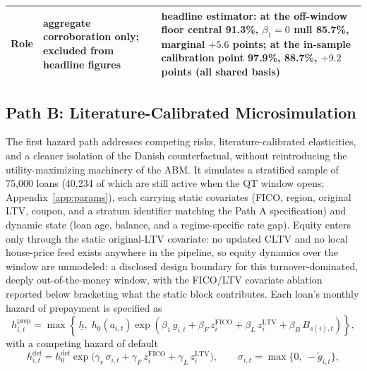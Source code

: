 \documentclass[12pt]{article}
\begin{document}
\begin{table}[H]
\begin{threeparttable}
\begin{tabular}{@{}p{2.2cm}p{5.9cm}p{5.9cm}@{}}
Role & aggregate corroboration only; excluded from headline figures & headline estimator: at the off-window floor central 91.3\%, $\beta_1 = 0$ null 85.7\%, marginal $+5.6$ points; at the in-sample calibration point 97.9\%, 88.7\%, $+9.2$ points (all shared basis) \\
\bottomrule
\end{tabular}
\end{threeparttable}
\end{table}

\subsection{Path B: Literature-Calibrated Microsimulation}\label{sec:pathb}

The first hazard path addresses competing risks, literature-calibrated elasticities, and a cleaner isolation of the Danish counterfactual, without reintroducing the utility-maximizing machinery of the ABM. It simulates a stratified sample of 75,000 loans (40,234 of which are still active when the QT window opens; Appendix~\ref{app:params}), each carrying static covariates (FICO, region, original LTV, coupon, and a stratum identifier matching the Path A specification) and dynamic state (loan age, balance, and a regime-specific rate gap). Equity enters only through the static original-LTV covariate: no updated CLTV and no local house-price feed exists anywhere in the pipeline, so equity dynamics over the window are unmodeled: a disclosed design boundary for this turnover-dominated, deeply out-of-the-money window, with the FICO/LTV covariate ablation reported below bracketing what the static block contributes. Each loan's monthly hazard of prepayment is specified as
\begin{equation}\label{eq:pathB}
h^{\mathrm{prep}}_{i,t} = \max\!\left\{\, \underline{h},\; h_0\!\left(a_{i,t}\right) \exp\!\left( \beta_1\, g_{i,t} + \beta_F\, z^{\mathrm{FICO}}_{i} + \beta_L\, z^{\mathrm{LTV}}_{i} + \beta_B\, B_{s(i),t} \right) \right\},
\end{equation}
with a competing hazard of default
\begin{equation}\label{eq:default}
h^{\mathrm{def}}_{i,t} = h^{\mathrm{def}}_0 \exp\!\big( \gamma_r\, \sigma_{i,t} + \gamma_F\, z^{\mathrm{FICO}}_{i} + \gamma_L\, z^{\mathrm{LTV}}_{i} \big), \qquad \sigma_{i,t} = \max\{0,\ -\tilde g_{i,t}\},
\end{equation}
\end{document}
